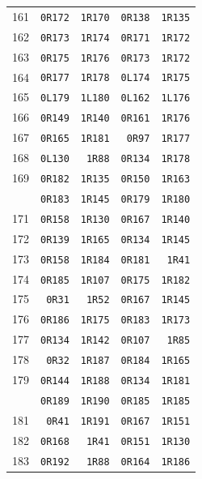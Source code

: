 \begin{longtable}{@{}r r r r r@{}}
161 & \texttt{0R172} & \texttt{1R170} & \texttt{0R138} & \texttt{1R135}\\
162 & \texttt{0R173} & \texttt{1R174} & \texttt{0R171} & \texttt{1R172}\\
163 & \texttt{0R175} & \texttt{1R176} & \texttt{0R173} & \texttt{1R172}\\
164 & \texttt{0R177} & \texttt{1R178} & \texttt{0L174} & \texttt{1R175}\\
165 & \texttt{0L179} & \texttt{1L180} & \texttt{0L162} & \texttt{1L176}\\
166 & \texttt{0R149} & \texttt{1R140} & \texttt{0R161} & \texttt{1R176}\\
167 & \texttt{0R165} & \texttt{1R181} & \texttt{0R97} & \texttt{1R177}\\
168 & \texttt{0L130} & \texttt{1R88} & \texttt{0R134} & \texttt{1R178}\\
169 & \texttt{0R182} & \texttt{1R135} & \texttt{0R150} & \texttt{1R163}\\
\addlinespace[3pt]
170 & \texttt{0R183} & \texttt{1R145} & \texttt{0R179} & \texttt{1R180}\\
171 & \texttt{0R158} & \texttt{1R130} & \texttt{0R167} & \texttt{1R140}\\
172 & \texttt{0R139} & \texttt{1R165} & \texttt{0R134} & \texttt{1R145}\\
173 & \texttt{0R158} & \texttt{1R184} & \texttt{0R181} & \texttt{1R41}\\
174 & \texttt{0R185} & \texttt{1R107} & \texttt{0R175} & \texttt{1R182}\\
175 & \texttt{0R31} & \texttt{1R52} & \texttt{0R167} & \texttt{1R145}\\
176 & \texttt{0R186} & \texttt{1R175} & \texttt{0R183} & \texttt{1R173}\\
177 & \texttt{0R134} & \texttt{1R142} & \texttt{0R107} & \texttt{1R85}\\
178 & \texttt{0R32} & \texttt{1R187} & \texttt{0R184} & \texttt{1R165}\\
179 & \texttt{0R144} & \texttt{1R188} & \texttt{0R134} & \texttt{1R181}\\
\addlinespace[3pt]
180 & \texttt{0R189} & \texttt{1R190} & \texttt{0R185} & \texttt{1R185}\\
181 & \texttt{0R41} & \texttt{1R191} & \texttt{0R167} & \texttt{1R151}\\
182 & \texttt{0R168} & \texttt{1R41} & \texttt{0R151} & \texttt{1R130}\\
183 & \texttt{0R192} & \texttt{1R88} & \texttt{0R164} & \texttt{1R186}\\

\end{longtable}
